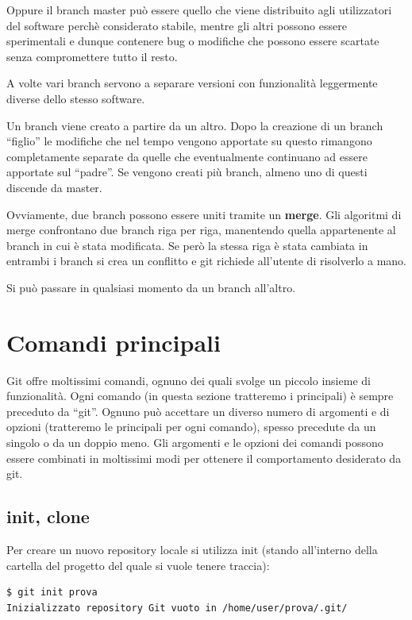\documentclass{article} \usepackage[textwidth=19cm,textheight=24cm]{geometry}
\begin{document}
Oppure il branch master può essere quello che viene distribuito agli
utilizzatori del software perchè considerato stabile, mentre gli altri possono
essere sperimentali e dunque contenere bug o modifiche che possono essere 
scartate senza compromettere tutto il resto. 

A volte vari branch servono a separare versioni
con funzionalità leggermente diverse dello stesso software.

Un branch viene creato a partire da un altro. Dopo la creazione di un branch
``figlio'' le modifiche che nel tempo vengono apportate su questo rimangono
completamente separate da quelle che eventualmente continuano ad essere
apportate sul ``padre''. Se vengono creati più branch, almeno uno di questi discende
da master.

Ovviamente, due branch possono essere uniti tramite un \textbf{merge}. Gli
algoritmi di merge confrontano due branch riga per riga, manentendo quella
appartenente al branch in cui è stata modificata. Se però la stessa riga è stata
cambiata in entrambi i branch si crea un conflitto e git richiede all'utente di 
risolverlo a mano.

Si può passare in qualsiasi momento da un branch all'altro.

\section{Comandi principali}

Git offre moltissimi comandi, ognuno dei quali svolge un piccolo insieme di
funzionalità. Ogni comando (in questa sezione tratteremo i principali) è sempre preceduto da
``git''. Ognuno può accettare un diverso numero di argomenti e di opzioni
(tratteremo le principali per ogni comando), spesso precedute da un singolo o da
un doppio meno. Gli argomenti e le opzioni dei comandi possono essere combinati
in moltissimi modi per ottenere il comportamento desiderato da git.

\subsection{init, clone}

Per creare un nuovo repository locale si utilizza init (stando all'interno
della cartella del progetto del quale si vuole tenere traccia):

\begin{verbatim}
$ git init prova
Inizializzato repository Git vuoto in /home/user/prova/.git/
\end{verbatim}
\end{document}
